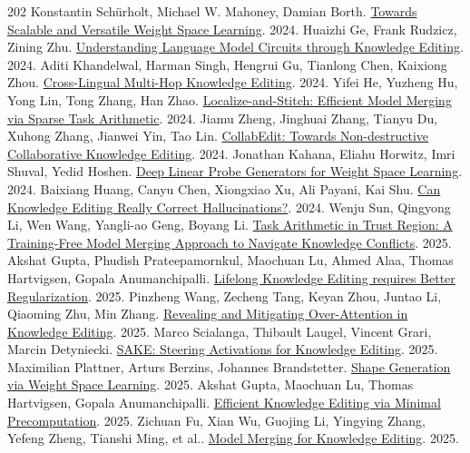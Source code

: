 \begin{thebibliography}{202}
 Konstantin Schürholt, Michael W. Mahoney, Damian Borth. \href{https://arxiv.org/abs/2406.09997v1}{Towards Scalable and Versatile Weight Space Learning}. 2024.
 Huaizhi Ge, Frank Rudzicz, Zining Zhu. \href{https://arxiv.org/abs/2406.17241v4}{Understanding Language Model Circuits through Knowledge Editing}. 2024.
 Aditi Khandelwal, Harman Singh, Hengrui Gu, Tianlong Chen, Kaixiong Zhou. \href{https://arxiv.org/abs/2407.10275v2}{Cross-Lingual Multi-Hop Knowledge Editing}. 2024.
 Yifei He, Yuzheng Hu, Yong Lin, Tong Zhang, Han Zhao. \href{https://arxiv.org/abs/2408.13656v2}{Localize-and-Stitch: Efficient Model Merging via Sparse Task Arithmetic}. 2024.
 Jiamu Zheng, Jinghuai Zhang, Tianyu Du, Xuhong Zhang, Jianwei Yin, Tao Lin. \href{https://arxiv.org/abs/2410.09508v4}{CollabEdit: Towards Non-destructive Collaborative Knowledge Editing}. 2024.
 Jonathan Kahana, Eliahu Horwitz, Imri Shuval, Yedid Hoshen. \href{https://arxiv.org/abs/2410.10811v2}{Deep Linear Probe Generators for Weight Space Learning}. 2024.
 Baixiang Huang, Canyu Chen, Xiongxiao Xu, Ali Payani, Kai Shu. \href{https://arxiv.org/abs/2410.16251v3}{Can Knowledge Editing Really Correct Hallucinations?}. 2024.
 Wenju Sun, Qingyong Li, Wen Wang, Yangli-ao Geng, Boyang Li. \href{https://arxiv.org/abs/2501.15065v1}{Task Arithmetic in Trust Region: A Training-Free Model Merging Approach to Navigate Knowledge Conflicts}. 2025.
 Akshat Gupta, Phudish Prateepamornkul, Maochuan Lu, Ahmed Alaa, Thomas Hartvigsen, Gopala Anumanchipalli. \href{https://arxiv.org/abs/2502.01636v2}{Lifelong Knowledge Editing requires Better Regularization}. 2025.
 Pinzheng Wang, Zecheng Tang, Keyan Zhou, Juntao Li, Qiaoming Zhu, Min Zhang. \href{https://arxiv.org/abs/2502.14838v1}{Revealing and Mitigating Over-Attention in Knowledge Editing}. 2025.
 Marco Scialanga, Thibault Laugel, Vincent Grari, Marcin Detyniecki. \href{https://arxiv.org/abs/2503.01751v2}{SAKE: Steering Activations for Knowledge Editing}. 2025.
 Maximilian Plattner, Arturs Berzins, Johannes Brandstetter. \href{https://arxiv.org/abs/2503.21830v1}{Shape Generation via Weight Space Learning}. 2025.
 Akshat Gupta, Maochuan Lu, Thomas Hartvigsen, Gopala Anumanchipalli. \href{https://arxiv.org/abs/2506.04226v1}{Efficient Knowledge Editing via Minimal Precomputation}. 2025.
 Zichuan Fu, Xian Wu, Guojing Li, Yingying Zhang, Yefeng Zheng, Tianshi Ming, et al.. \href{https://arxiv.org/abs/2506.12384v1}{Model Merging for Knowledge Editing}. 2025.

\end{thebibliography}
